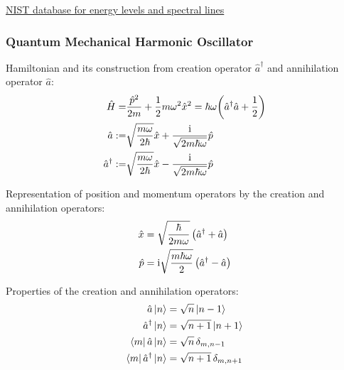 			\noindent
			\href{https://www.nist.gov/pml/atomic-spectra-database}{NIST database for energy levels and spectral lines}

		\subsubsection{Quantum Mechanical Harmonic Oscillator}
			\noindent
			Hamiltonian and its construction from creation operator $\hat{a}^\dagger$ and annihilation operator $\hat{a}$:
			\begin{equation}
				\begin{aligned}
					\hat{H} =& \frac{\hat{p}^2}{2m} + \frac{1}{2}m\omega^2 \hat{x}^2 = \hbar\omega\qty(\hat{a}^\dagger \hat{a} + \frac{1}{2}) \\
					\hat{a} :=& \sqrt{\frac{m\omega}{2\hbar}}\hat{x} + \frac{\mathrm{i}}{\sqrt{2m\hbar\omega}}\hat{p} \\
					\hat{a}^\dagger :=& \sqrt{\frac{m\omega}{2\hbar}}\hat{x} - \frac{\mathrm{i}}{\sqrt{2m\hbar\omega}}\hat{p} \\
				\end{aligned}
			\end{equation}

			\noindent
			Representation of position and momentum operators by the creation and annihilation operators:
			\begin{equation}
				\begin{aligned}
					\hat{x} &= \sqrt{\frac{\hbar}{2m\omega}}\left(\hat{a}^\dagger + \hat{a} \right) \\
					\hat{p} &= \mathrm{i}\sqrt{\frac{m\hbar\omega}{2}}\left(\hat{a}^\dagger - \hat{a} \right) \\
				\end{aligned}
			\end{equation}

			\noindent
			Properties of the creation and annihilation operators:
			\begin{equation}
				\begin{aligned}
					\hat{a}\Ket{n} &= \sqrt{n}\Ket{n-1} \\
					\hat{a}^\dagger\Ket{n} &= \sqrt{n+1}\Ket{n+1} \\
					\Bra{m}\hat{a}\Ket{n} &= \sqrt{n} \,\delta_{m,n-1} \\
					\Bra{m}\hat{a}^\dagger\Ket{n} &= \sqrt{n+1} \,\delta_{m,n+1} \\
				\end{aligned}
			\end{equation}

